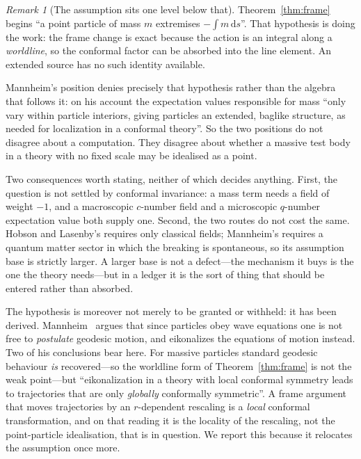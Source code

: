 \documentclass[11pt]{article}
\theoremstyle{definition}
\theoremstyle{remark}
\newtheorem{remark}[theorem]{Remark}
\newcommand{\dd}{\mathrm d}
\begin{document}
\begin{remark}[The assumption sits one level below that]
\label{rem:pointparticle}
Theorem~\ref{thm:frame} begins ``a point particle of mass \(m\) extremises
\(-\!\int m\,\dd s\)''.  That hypothesis is doing the work: the frame change
is exact because the action is an integral along a \emph{worldline}, so the
conformal factor can be absorbed into the line element.  An extended source has
no such identity available.

Mannheim's position denies precisely that hypothesis rather than the algebra
that follows it: on his account the expectation values responsible for mass
``only vary within particle interiors, giving particles an extended, baglike
structure, as needed for localization in a conformal theory''.  So the two
positions do not disagree about a computation.  They disagree about whether a
massive test body in a theory with no fixed scale may be idealised as a point.

Two consequences worth stating, neither of which decides anything.  First, the
question is not settled by conformal invariance: a mass term needs a field of
weight \(-1\), and a macroscopic \(c\)-number field and a microscopic
\(q\)-number expectation value both supply one.  Second, the two routes do not
cost the same.  Hobson and Lasenby's requires only classical fields; Mannheim's
requires a quantum matter sector in which the breaking is spontaneous, so its
assumption base is strictly larger.  A larger base is not a defect---the
mechanism it buys is the one the theory needs---but in a ledger it is the sort
of thing that should be entered rather than absorbed.

The hypothesis is moreover not merely to be granted or withheld: it has been
derived.  Mannheim~\cite{Mannheim2022b} argues that since particles obey wave
equations one is not free to \emph{postulate} geodesic motion, and eikonalizes
the equations of motion instead.  Two of his conclusions bear here.  For
massive particles standard geodesic behaviour \emph{is} recovered---so the
worldline form of Theorem~\ref{thm:frame} is not the weak point---but
``eikonalization in a theory with local conformal symmetry leads to
trajectories that are only \emph{globally} conformally symmetric''.  A frame
argument that moves trajectories by an \(r\)-dependent rescaling is a
\emph{local} conformal transformation, and on that reading it is the locality
of the rescaling, not the point-particle idealisation, that is in question.  We
report this because it relocates the assumption once more.


\end{remark}
\end{document}
